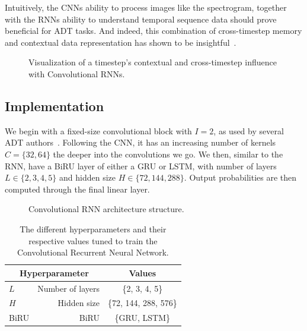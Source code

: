 Intuitively, the \glspl{CNN} ability to process images like the spectrogram, together with the \glspl{RNN} ability to understand temporal sequence data should prove beneficial for \gls{ADT} tasks. And indeed, this combination of cross-timestep memory and contextual data representation has shown to be insightful~\cite{Vogl2017DrumTV, vogl2018multiinstrumentdrumtranscription, signals4040042}.

\begin{figure}[H]
    \centering
    
    \caption{Visualization of a timestep's contextual and cross-timestep influence with Convolutional RNNs.}
    \label{CRNNInfluenceFigure}
\end{figure}

\subsection{Implementation}

We begin with a fixed-size convolutional block with $I = 2$, as used by several \gls{ADT} authors~\cite{Vogl2017DrumTV, signals4040042}. Following the \gls{CNN}, it has an increasing number of kernels $C = \{32, 64\}$ the deeper into the convolutions we go. We then, similar to the \gls{RNN}, have a \gls{BiRU} layer of either a \gls{GRU} or \gls{LSTM}, with number of layers $L \in \{2, 3, 4, 5\}$ and hidden size $H \in \{72, 144, 288\}$. Output probabilities are then computed through the final linear layer.

\begin{figure}[H]
    \centering
    
    \caption{Convolutional RNN architecture structure.}
    \label{CRNNFigure}
\end{figure}

\begin{table}[H]
    \centering
    \begin{tabular}{lr|c}
        \multicolumn{2}{c|}{Hyperparameter} & Values       \\
        \hline
        $L$ & Number of layers      & \{2, 3, 4, 5\} \\
        $H$ & Hidden size      & \{72, 144, 288, 576\} \\
        \gls{BiRU} & \acrlong{BiRU} & \{\gls{GRU}, \gls{LSTM}\}\\
    \end{tabular}
    \caption{The different hyperparameters and their respective values tuned to train the Convolutional Recurrent Neural Network.}
    \label{CRNNHyperparams}
\end{table}

